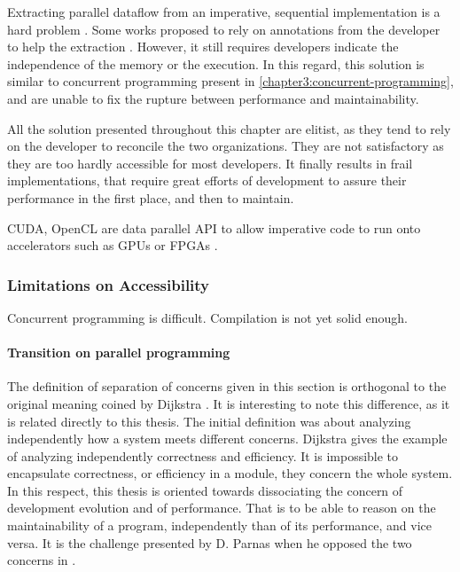 Extracting parallel dataflow from an imperative, sequential implementation is a hard problem \cite{Johnston2004a}.
Some works proposed to rely on annotations from the developer to help the extraction \cite{Vandierendonck2010a,Fernandez2014a}.
However, it still requires developers indicate the independence of the memory or the execution.
In this regard, this solution is similar to concurrent programming present in \ref{chapter3:concurrent-programming}, and are unable to fix the rupture between performance and maintainability.

All the solution presented throughout this chapter are elitist, as they tend to rely on the developer to reconcile the two organizations.
They are not satisfactory as they are too hardly accessible for most developers.
It finally results in frail implementations, that require great efforts of development to assure their performance in the first place, and then to maintain.



CUDA, OpenCL are data parallel API to allow imperative code to run onto accelerators such as GPUs or FPGAs \cite{Stone2010}.



\subsubsection{Limitations on Accessibility}

Concurrent programming is difficult.
Compilation is not yet solid enough.

\paragraph{Transition on parallel programming}

The definition of separation of concerns given in this section is orthogonal to the original meaning coined by Dijkstra \cite{Dijkstra1982}.
It is interesting to note this difference, as it is related directly to this thesis.
The initial definition was about analyzing independently how a system meets different concerns.
Dijkstra gives the example of analyzing independently correctness and efficiency.
It is impossible to encapsulate correctness, or efficiency in a module, they concern the whole system.
In this respect, this thesis is oriented towards dissociating the concern of development evolution and of performance.
That is to be able to reason on the maintainability of a program, independently than of its performance, and vice versa.
It is the challenge presented by D. Parnas when he opposed the two concerns in \cite{Parnas1972}.

